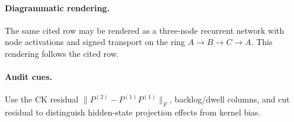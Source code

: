 \paragraph{Diagrammatic rendering.} The same cited row may be rendered as a three-node recurrent network with node activations and signed transport on the ring $A\to B\to C\to A$. This rendering follows the cited row.
\begin{center}
\end{center}
\paragraph{Audit cues.} Use the CK residual $\|P^{(2)}-P^{(1)}P^{(1)}\|_F$, backlog/dwell columns, and cut residual to distinguish hidden-state projection effects from kernel bias.
